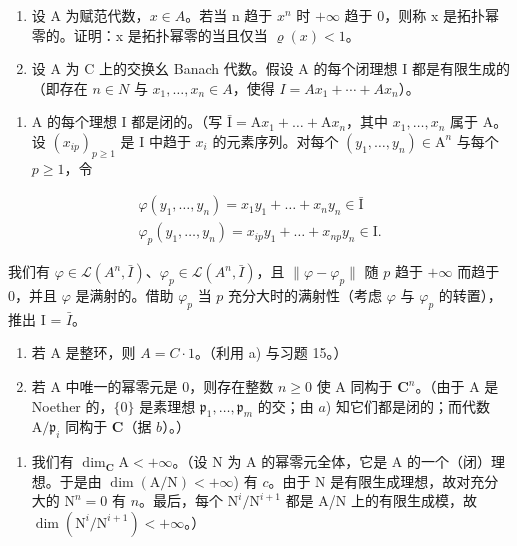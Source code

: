 \begin{enumerate}
\def\labelenumi{\arabic{enumi})}
\setcounter{enumi}{31}
\item
  设 A 为赋范代数，\(x \in A\)。若当 n 趋于 \(x^{n}\) 时 \(+\infty\) 趋于 0，则称 x 是拓扑幂零的。证明：x 是拓扑幂零的当且仅当 \(\varrho(x) < 1\)。
\item
  设 A 为 C 上的交换幺 Banach 代数。假设 A 的每个闭理想 I 都是有限生成的（即存在 \(n \in N\) 与 \(x_{1}, \ldots, x_{n} \in A\)，使得 \(I = Ax_{1} + \cdots + Ax_{n}\)）。
\end{enumerate}

\begin{enumerate}
\def\labelenumi{\alph{enumi})}
\tightlist
\item
  A 的每个理想 I 都是闭的。（写 \(\bar{\mathrm{I}} = \mathrm{A}x_{1} + \dots +\mathrm{A}x_{n}\)，其中 \(x_{1},\ldots ,x_{n}\) 属于 A。设 \((x_{ip})_{p\geqslant 1}\) 是 I 中趋于 \(x_{i}\) 的元素序列。对每个 \((y_{1},\ldots ,y_{n})\in \mathrm{A}^{n}\) 与每个 \(p\geqslant 1\)，令
\end{enumerate}

\[
\begin{array}{c} \varphi (y _ {1}, \ldots , y _ {n}) = x _ {1} y _ {1} + \dots + x _ {n} y _ {n} \in \bar {\mathrm{I}} \\ \varphi_ {p} (y _ {1}, \ldots , y _ {n}) = x _ {i p} y _ {1} + \dots + x _ {n p} y _ {n} \in \mathrm{I}. \end{array}
\]

我们有 \(\varphi\in\mathcal{L}(A^{n},\bar{I})\)、\(\varphi_{p}\in\mathcal{L}(A^{n},\bar{I})\)，且 \(\|\varphi-\varphi_{p}\|\) 随 \(p\) 趋于 \(+\infty\) 而趋于 0，并且 \(\varphi\) 是满射的。借助 \(\varphi_{p}\) 当 \(p\) 充分大时的满射性（考虑 \(\varphi\) 与 \(\varphi_{p}\) 的转置），推出 I = \(\bar{I}\)。

\begin{enumerate}
\def\labelenumi{\alph{enumi})}
\setcounter{enumi}{1}
\item
  若 A 是整环，则 \(A = C \cdot 1\)。（利用 a) 与习题 15。）
\item
  若 A 中唯一的幂零元是 0，则存在整数 \(n \geqslant 0\) 使 A 同构于 \(\mathbf{C}^n\)。（由于 A 是 Noether 的，\(\{0\}\) 是素理想 \(\mathfrak{p}_1, \ldots, \mathfrak{p}_m\) 的交；由 \(a\)) 知它们都是闭的；而代数 \(\mathrm{A}/\mathfrak{p}_i\) 同构于 \(\mathbf{C}\)（据 \(b\)）。）
\end{enumerate}

\begin{enumerate}
\def\labelenumi{\alph{enumi})}
\setcounter{enumi}{3}
\tightlist
\item
  我们有 \(\dim_{\mathbf{C}}\mathrm{A} < +\infty\)。（设 N 为 A 的幂零元全体，它是 A 的一个（闭）理想。于是由 \(\dim (\mathrm{A / N}) < +\infty\)) 有 \(c\)。由于 N 是有限生成理想，故对充分大的 \(\mathrm{N}^n = 0\) 有 \(n\)。最后，每个 \(\mathrm{N}^i /\mathrm{N}^{i + 1}\) 都是 A/N 上的有限生成模，故 \(\dim (\mathrm{N}^i /\mathrm{N}^{i + 1}) < +\infty\)。）
\end{enumerate}

